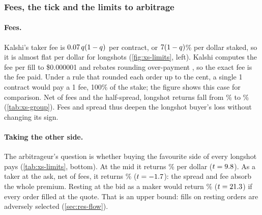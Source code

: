 \subsubsection{Fees, the tick and the limits to arbitrage}\label{sec:res-xs-limits}

\paragraph{Fees.}
Kalshi's taker fee is $0.07\,q(1-q)$ per contract, or $7(1-q)$\% per dollar staked, so it is
almost flat per dollar for longshots (\cref{fig:xs-limits}, left). Kalshi computes the fee per fill to
\$0.000001 and rebates rounding over-payment \citep{kalshirounding}, so the exact fee is the fee
paid. Under a rule that rounded each order up to the cent, a single 1\cents{} contract would pay a
1\cents{} fee, 100\% of the stake; the figure shows this case for comparison. Net of fees and the half-spread, longshot
returns fall from \xsAllLsMid\% to \xsAllLsNet\% (\cref{tab:xs-group}). Fees and spread thus deepen the
longshot buyer's loss without changing its sign.

\paragraph{Taking the other side.}
The arbitrageur's question is whether buying the favourite side of every longshot pays
(\cref{tab:xs-limits}, bottom). At the mid it returns \xsOtherAllMid\% per dollar ($t=9.8$).
As a taker at the ask, net of fees, it returns \xsOtherAllTakerNet\% ($t=-1.7$): the
spread and fee absorb the whole premium. Resting at the bid as a maker would return \xsOtherAllMakerNet\%
($t=21.3$) if every order filled at the quote. That is an upper bound: fills on resting
orders are adversely selected (\cref{sec:res-flow}).

